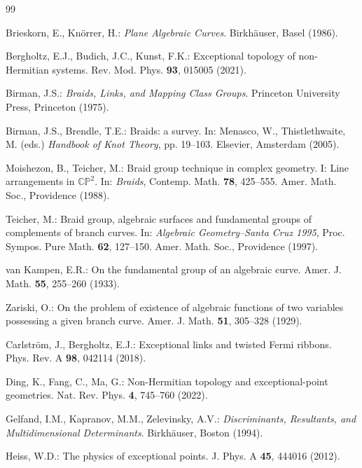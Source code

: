 \documentclass[11pt]{article}
\numberwithin{equation}{section}
\begin{document}
\begin{thebibliography}{99}

Brieskorn, E., Kn\"{o}rrer, H.: \emph{Plane Algebraic Curves}. Birkh\"{a}user,
Basel (1986).

Bergholtz, E.J., Budich, J.C., Kunst, F.K.: Exceptional topology of
non-Hermitian systems. Rev. Mod. Phys. \textbf{93}, 015005 (2021).

Birman, J.S.: \emph{Braids, Links, and Mapping Class Groups}. Princeton
University Press, Princeton (1975).


Birman, J.S., Brendle, T.E.: Braids: a survey. In: Menasco, W., Thistlethwaite, M. (eds.)
\emph{Handbook of Knot Theory}, pp. 19--103. Elsevier, Amsterdam (2005).


Moishezon, B., Teicher, M.: Braid group technique in complex geometry. I:
Line arrangements in \(\mathbb{CP}^2\). In: \emph{Braids}, Contemp. Math.
\textbf{78}, 425--555. Amer. Math. Soc., Providence (1988).

Teicher, M.: Braid group, algebraic surfaces and fundamental groups of
complements of branch curves. In: \emph{Algebraic Geometry--Santa Cruz 1995},
Proc. Sympos. Pure Math. \textbf{62}, 127--150. Amer. Math. Soc., Providence
(1997).

van Kampen, E.R.: On the fundamental group of an algebraic curve. Amer. J.
Math. \textbf{55}, 255--260 (1933).

Zariski, O.: On the problem of existence of algebraic functions of two
variables possessing a given branch curve. Amer. J. Math. \textbf{51},
305--328 (1929).

Carlstr\"{o}m, J., Bergholtz, E.J.: Exceptional links and twisted Fermi
ribbons. Phys. Rev. A \textbf{98}, 042114 (2018).

Ding, K., Fang, C., Ma, G.: Non-Hermitian topology and exceptional-point
geometries. Nat. Rev. Phys. \textbf{4}, 745--760 (2022).

Gelfand, I.M., Kapranov, M.M., Zelevinsky, A.V.:
\emph{Discriminants, Resultants, and Multidimensional Determinants}.
Birkh\"{a}user, Boston (1994).

Heiss, W.D.: The physics of exceptional points. J. Phys. A \textbf{45},
444016 (2012).


\end{thebibliography}
\end{document}
